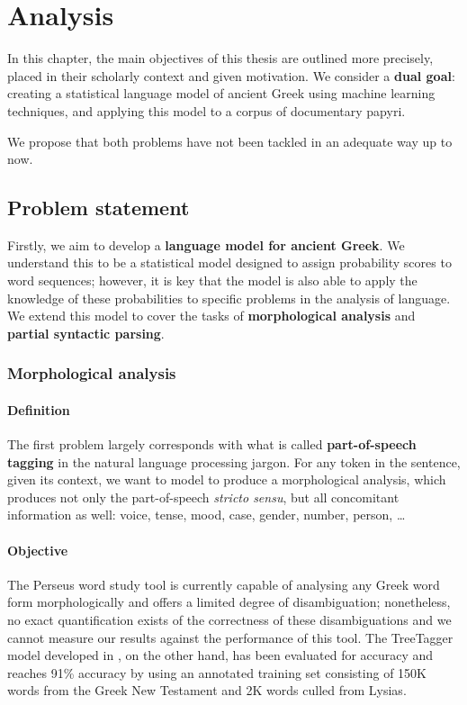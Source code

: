 
\chapter{Analysis}
\label{chp:analysis} %

In this chapter, the main objectives of this thesis are outlined more
precisely, placed in their scholarly context and given motivation. We
consider a \textbf{dual goal}: creating a statistical language model
of ancient Greek using machine learning techniques, and applying this
model to a corpus of documentary papyri.

We propose that both problems have not been tackled in an adequate way
up to now.

\section{Problem statement}
Firstly, we aim to develop a \textbf{language model for ancient
Greek}. We understand this to be a statistical model designed to
assign probability scores to word sequences; however, it is key that
the model is also able to apply the knowledge of these probabilities
to specific problems in the analysis of language. We extend this model
to cover the tasks of \textbf{morphological analysis} and
\textbf{partial syntactic parsing}.

\subsection{Morphological analysis}

\subsubsection{Definition}
The first problem largely corresponds with what is called
\textbf{part-of-speech tagging} in the natural language processing
jargon. For any token in the sentence, given its context, we want to
model to produce a morphological analysis, which produces not only the
part-of-speech \textit{stricto sensu}, but all concomitant information
as well: voice, tense, mood, case, gender, number, person, \ldots

\subsubsection{Objective}
The Perseus word study tool is currently capable of analysing any
Greek word form morphologically and offers a limited degree of
disambiguation; nonetheless, no exact quantification exists of the
correctness of these disambiguations and we cannot measure our results
against the performance of this tool. The TreeTagger model developed
in \cite{dik2008,dik2009}, on the other hand, has been evaluated for
accuracy and reaches 91\% accuracy by using an annotated training set
consisting of 150K words from the Greek New Testament and 2K words
culled from Lysias.

